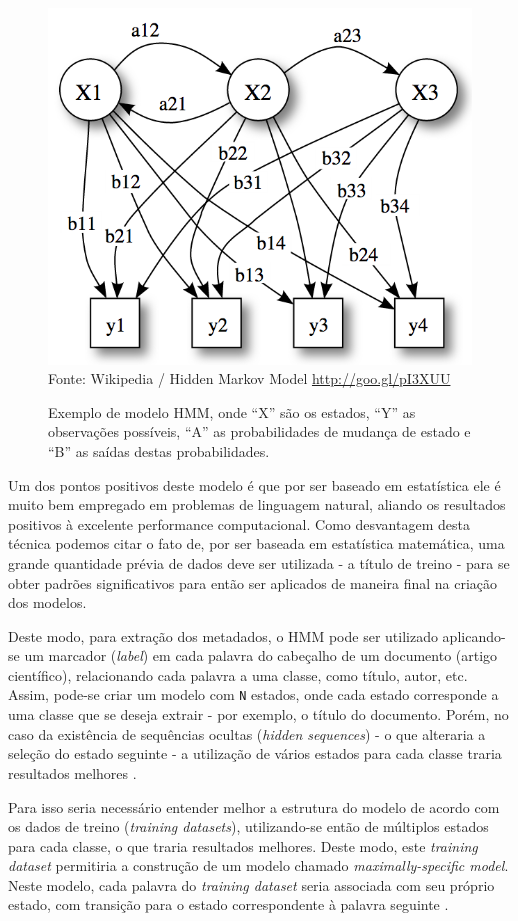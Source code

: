 \begin{figure}
    \centering
    \caption{Exemplo de modelo HMM, onde ``X'' são os estados, ``Y'' as observações possíveis, ``A'' as probabilidades de mudança de estado e ``B'' as saídas destas probabilidades.}
    \label{fig:hmm-states}
    \includegraphics[width=0.7\linewidth]{./assets/images/hmm-states}
    \center\footnotesize{Fonte: Wikipedia / Hidden Markov Model \url{http://goo.gl/pI3XUU}}
\end{figure}

Um dos pontos positivos deste modelo é que por ser baseado em estatística ele é muito bem empregado em problemas de linguagem natural, aliando os resultados positivos à excelente performance computacional. Como desvantagem desta técnica podemos citar o fato de, por ser baseada em estatística matemática, uma grande quantidade prévia de dados deve ser utilizada - a título de treino - para se obter padrões significativos para então ser aplicados de maneira final na criação dos modelos.

Deste modo, para extração dos metadados, o HMM pode ser utilizado aplicando-se um marcador (\textit{label}) em cada palavra do cabeçalho de um documento (artigo científico), relacionando cada palavra a uma classe, como título, autor, etc. Assim, pode-se criar um modelo com \texttt{N} estados, onde cada estado corresponde a uma classe que se deseja extrair - por exemplo, o título do documento. Porém, no caso da existência de sequências ocultas (\textit{hidden sequences}) - o que alteraria a seleção do estado seguinte - a utilização de vários estados para cada classe traria resultados melhores \cite{Seymore-HMM-IE}.


Para isso seria necessário entender melhor a estrutura do modelo de acordo com os dados de treino (\textit{training datasets}), utilizando-se então de múltiplos estados para cada classe, o que traria resultados melhores. Deste modo, este \textit{training dataset} permitiria a construção de um modelo chamado \textit{maximally-specific model}. Neste modelo, cada palavra do \textit{training dataset} seria associada com seu próprio estado, com transição para o estado correspondente à palavra seguinte \cite{Seymore-HMM-IE}.

